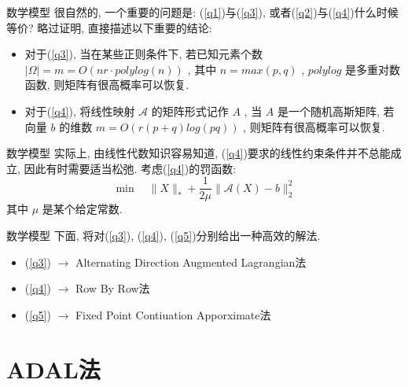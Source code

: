 \documentclass[slidestop, compress, mathserif, UTF8]{beamer}
\numberwithin{equation}{section}                                        %
\begin{document}
			\begin{frame}[t]{数学模型 }
				很自然的, 一个重要的问题是: (\ref{q1})与(\ref{q3}), 或者(\ref{q2})与(\ref{q4})什么时候等价? 略过证明, 直接描述以下重要的结论:
				
				\begin{itemize}
					\item 对于(\ref{q3}), 当在某些正则条件下, 若已知元素个数 $\lvert{\Omega}\rvert = m = O(nr \cdot polylog(n))$ , 其中 $n=max(p,q)$ , $polylog$ 是多重对数函数, 则矩阵有很高概率可以恢复.\\

					\item 对于(\ref{q4}), 将线性映射 $\mathcal{A}$ 的矩阵形式记作 $A$ , 当 $A$ 是一个随机高斯矩阵, 若向量 $b$ 的维数 $m = O(r(p + q)log(pq))$ , 则矩阵有很高概率可以恢复.
				\end{itemize}
			\end{frame}
			\begin{frame}[t]{数学模型}
				实际上, 由线性代数知识容易知道, (\ref{q4})要求的线性约束条件并不总能成立, 因此有时需要适当松弛. 考虑(\ref{q4})的罚函数:
				\begin{equation}\label{q5}
					\min \quad \lVert{X}\rVert_*+ \frac{1}{2\mu} \lVert{\mathcal{A}(X) - b}\rVert_2^2
				\end{equation}
				\small{其中 $\mu$ 是某个给定常数.}\normalsize
			\end{frame}
			\begin{frame}[t]{数学模型}
				下面, 将对(\ref{q3}), (\ref{q4}), (\ref{q5})分别给出一种高效的解法.

				\begin{itemize}
					\item (\ref{q3}) $\rightarrow$ Alternating Direction Augmented Lagrangian法

					\item (\ref{q4}) $\rightarrow$ Row By Row法

					\item (\ref{q5}) $\rightarrow$ Fixed Point Contiuation Apporximate法

				\end{itemize}
			\end{frame}
	\section{ADAL法}\label{section2}
\end{document}
